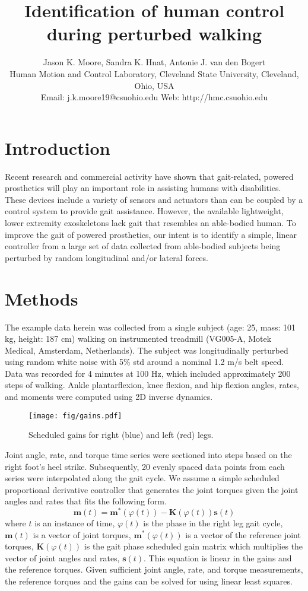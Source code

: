 \documentclass[10pt,letterpaper,notitlepage,twocolumn]{article}
\title{\bf Identification of human control during perturbed walking}
\author{
  Jason K. Moore, Sandra K. Hnat, Antonie J. van den Bogert\\
  Human Motion and Control Laboratory, Cleveland State University, Cleveland, Ohio, USA\\
  Email: j.k.moore19@csuohio.edu Web: http://hmc.csuohio.edu
}
\date{}
\begin{document}
\maketitle

\section*{Introduction}
%
Recent research and commercial activity have shown that gait-related, powered
prosthetics will play an important role in assisting humans with disabilities.
These devices include a variety of sensors and actuators than can be coupled by
a control system to provide gait assistance. However, the available
lightweight, lower extremity exoskeletons lack gait that resembles an
able-bodied human. To improve the gait of powered prosthetics, our intent is to
identify a simple, linear controller from a large set of data collected from
able-bodied subjects being perturbed by random longitudinal and/or lateral
forces.
%
\section*{Methods}
The example data herein was collected from a single subject (age: 25, mass: 101
kg, height: 187 cm) walking on instrumented treadmill (VG005-A, Motek Medical,
Amsterdam, Netherlands). The subject was longitudinally perturbed using random
white noise with 5\% std around a nominal 1.2 m/s belt speed. Data was recorded
for 4 minutes at 100 Hz, which included approximately 200 steps of walking.
Ankle plantarflexion, knee flexion, and hip flexion angles, rates, and moments
were computed using 2D inverse dynamics.
%
\begin{figure}[hbt]
  \begin{center}
    \texttt{[image: fig/gains.pdf]}
    \caption{Scheduled gains for right (blue) and left (red) legs.}
    \label{fig:gains}
  \end{center}
\end{figure}

Joint angle, rate, and torque time series were sectioned into steps based on
the right foot's heel strike. Subsequently, 20 evenly spaced data points from
each series were interpolated along the gait cycle. We assume a simple
scheduled proportional derivative controller that generates the joint torques
given the joint angles and rates that fits the following form.
%
\begin{equation}
  \mathbf{m}(t) = \mathbf{m}^*(\varphi(t)) -
  \mathbf{K}(\varphi(t))\mathbf{s}(t)
\end{equation}
%
where $t$ is an instance of time, $\varphi(t)$ is the phase in the right leg
gait cycle, $\mathbf{m}(t)$ is a vector of joint torques,
$\mathbf{m}^*(\varphi(t))$ is a vector of the reference joint torques,
$\mathbf{K}(\varphi(t))$ is the gait phase scheduled gain matrix which
multiplies the vector of joint angles and rates, $\mathbf{s}(t)$. This equation
is linear in the gains and the reference torques. Given sufficient joint angle,
rate, and torque measurements, the reference torques and the gains can be
solved for using linear least squares.
%
\end{document}
